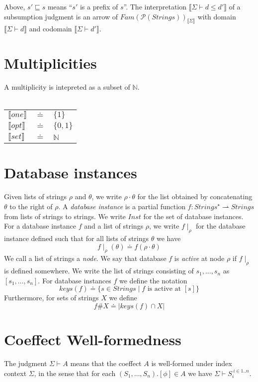 \documentclass{article}
\newcommand{\sem}[1]{\llbracket #1 \rrbracket}
\begin{document}
Above, $s' \sqsubseteq s$ means ``$s'$ is a prefix of $s$''. 
The interpretation $\sem{\Sigma \vdash d \leq d'}$ of a subsumption judgment is an arrow of $\mathit{Fam}(\mathcal P(\mathit{Strings}))_{\sem{\Sigma}}$ with domain $\sem{\Sigma \vdash d}$ and codomain $\sem{\Sigma \vdash d'}$.

\section*{Multiplicities}

A multiplicity is intepreted as a subset of $\mathbb N$.\\~\\
\begin{tabular}{lll}
$\sem{one}$ & $\doteq$ & $\{ 1 \}$ \\
$\sem{opt}$ & $\doteq$ & $\{ 0, 1 \}$ \\
$\sem{set}$ & $\doteq$ & $\mathbb N$
\end{tabular}
\section*{Database instances}

Given lists of strings $\rho$ and $\theta$, we write $\rho \cdot \theta$ for the list obtained by concatenating $\theta$ to the right of $\rho$. A \emph{database instance} is a partial function $f : \mathit{Strings}^{\star} \rightharpoonup \mathit{Strings}$ from lists of strings to strings. We write $\mathit{Inst}$ for the set of database instances. For a database instance $f$ and a list of strings $\rho$, we write $f \! \mid_\rho$ for the database instance defined such that for all lists of strings $\theta$ we have $$f \! \mid_\rho \! (\theta) \doteq f(\rho \cdot \theta)$$ We call a list of strings a \emph{node}. We say that database $f$ is \emph{active} at node $\rho$ if $f \! \mid_\rho$ is defined somewhere. We write the list of strings consisting of $s_1, \ldots, s_n$ as $[s_1,\ldots,s_n]$. For database instances $f$ we define the notation $$\mathit{keys}(f) \doteq \{ s \in \mathit{Strings} \mid f \text{ is active at } [s] \}$$ Furthermore, for sets of strings $X$ we define
$$f \# X \doteq | \mathit{keys}(f) \cap X |$$ 


\section*{Coeffect Well-formedness}

The judgment $\Sigma \vdash A$ means that the coeffect $A$ is well-formed under index context $\Sigma$,
in the sense that for each $(S_1,\ldots,S_n).[\phi] \in A$ we have $\Sigma \vdash S_i^{~i \in 1..n}$.
\end{document}
